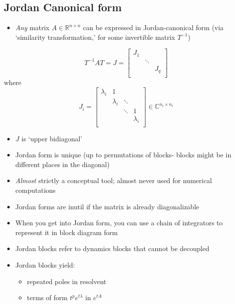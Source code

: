 \documentclass[10pt,letterpaper]{article}
\begin{document}
\subsection{Jordan Canonical form}
\label{sec-11_14}

\begin{itemize}
\item \emph{Any} matrix $A \in \mathbb{R}^{n\times n}$ can be expressed in Jordan-canonical form (via `similarity transformation,' for some invertible matrix $T ^{-1}$)
\end{itemize}
$$
T ^{-1} AT=J=
\begin{bmatrix}
  J_1 &        &     \\
      & \ddots &     \\
      &        & J_q \\
\end{bmatrix}
$$ 
where
$$
J_i =
\begin{bmatrix}
  \lambda_i &         1 &        &           \\
            & \lambda_i & \ddots &           \\
            &           & \ddots &         1 \\
            &           &        & \lambda_i \\
\end{bmatrix}
\in \mathbb C ^{n_i \times n_i}
$$ 

\begin{itemize}
\item $J$ is `upper bidiagonal'
\item Jordan form is unique (up to permutations of blocks- blocks might be in different places in the diagonal)
\item \emph{Almost} strictly a conceptual tool; almost never used for numerical computations
\item Jordan forms are inutil if the matrix is already diagonalizable
\item When you get into Jordan form, you can use a chain of integrators to represent it in block diagram form
\item Jordan blocks refer to dynamics blocks that cannot be decoupled
\item Jordan blocks yield:

\begin{itemize}
\item repeated poles in resolvent
\item terms of form $t ^{p} e ^{t\lambda}$ in $e ^{tA}$
\end{itemize}

\end{itemize}
\end{document}
